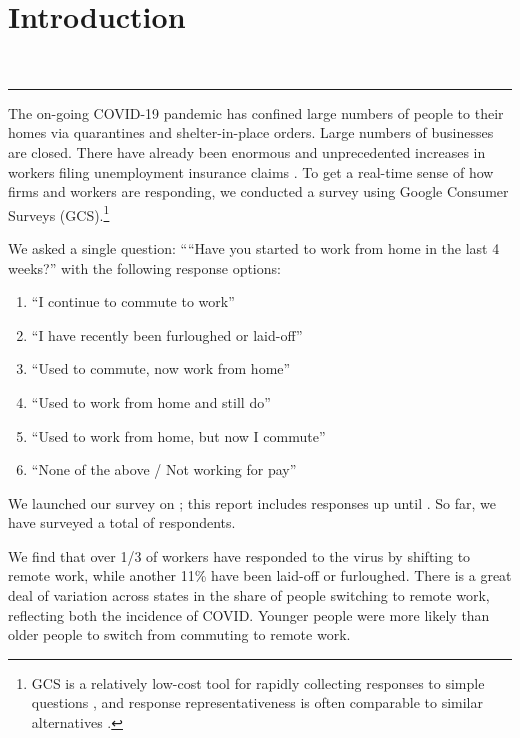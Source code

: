 \documentclass[12pt]{article}
\newcommand{\covid}{COVID-19}
\begin{document}
\section{Introduction}
   \\
   \newline
   \newline
  {\color{red} \rule{\linewidth}{0.5mm}}

The on-going \covid{} pandemic has confined large numbers of people to their homes via quarantines and shelter-in-place orders.
Large numbers of businesses are closed. 
There have already been enormous and unprecedented increases in workers filing unemployment insurance claims \citep{goldsmith2020}. 
To get a real-time sense of how firms and workers are responding, we conducted a survey using Google Consumer Surveys (GCS).\footnote{
GCS is a relatively low-cost tool for rapidly collecting responses to simple questions \cite{stephens2014hands}, and response representativeness is often comparable to similar alternatives \citep{santoso2016survey, brynjolfsson2019using}.
}

We asked a single question:
````Have you started to work from home in the last 4 weeks?''
with the following response options: 
\begin{enumerate} 
\item ``I continue to commute to work''
\item ``I have recently been furloughed or laid-off''
\item ``Used to commute, now work from home''   
\item ``Used to work from home and still do''       
\item ``Used to work from home, but now I commute''
\item ``None of the above / Not working for pay''
\end{enumerate} 

We launched our survey on \SurveyStart{}; this report includes responses up until \SurveyEnd{}. 
So far, we have surveyed a total of \numObs{} respondents.  

We find that over 1/3 of workers have responded to the virus by shifting to remote work, while another 11\% have been laid-off or furloughed. There is a great deal of variation across states in the share of people switching to remote work, reflecting both the incidence of COVID. Younger people were more likely than older people to switch from commuting to remote work.
\end{document}
